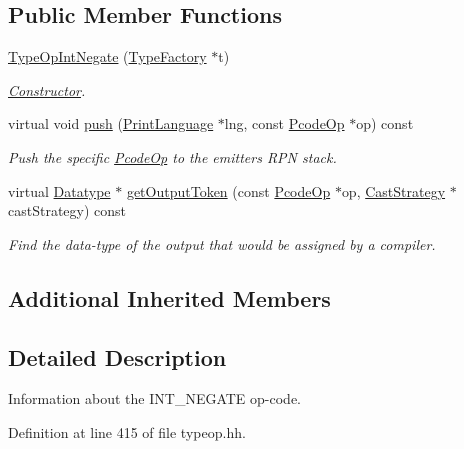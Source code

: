 \subsection*{Public Member Functions}
\begin{DoxyCompactItemize}
\item 
\mbox{\hyperlink{class_type_op_int_negate_abe71f2cf09961b16a1ce42c3e582a400}{Type\+Op\+Int\+Negate}} (\mbox{\hyperlink{class_type_factory}{Type\+Factory}} $\ast$t)
\begin{DoxyCompactList}\small\item\em \mbox{\hyperlink{class_constructor}{Constructor}}. \end{DoxyCompactList}\item 
virtual void \mbox{\hyperlink{class_type_op_int_negate_aea54f310805501b412ad1423c681006e}{push}} (\mbox{\hyperlink{class_print_language}{Print\+Language}} $\ast$lng, const \mbox{\hyperlink{class_pcode_op}{Pcode\+Op}} $\ast$op) const
\begin{DoxyCompactList}\small\item\em Push the specific \mbox{\hyperlink{class_pcode_op}{Pcode\+Op}} to the emitter\textquotesingle{}s R\+PN stack. \end{DoxyCompactList}\item 
virtual \mbox{\hyperlink{class_datatype}{Datatype}} $\ast$ \mbox{\hyperlink{class_type_op_int_negate_ab07156bd47d9e57427cb3b32aa52f12e}{get\+Output\+Token}} (const \mbox{\hyperlink{class_pcode_op}{Pcode\+Op}} $\ast$op, \mbox{\hyperlink{class_cast_strategy}{Cast\+Strategy}} $\ast$cast\+Strategy) const
\begin{DoxyCompactList}\small\item\em Find the data-\/type of the output that would be assigned by a compiler. \end{DoxyCompactList}\end{DoxyCompactItemize}
\subsection*{Additional Inherited Members}


\subsection{Detailed Description}
Information about the I\+N\+T\+\_\+\+N\+E\+G\+A\+TE op-\/code. 

Definition at line 415 of file typeop.\+hh.



